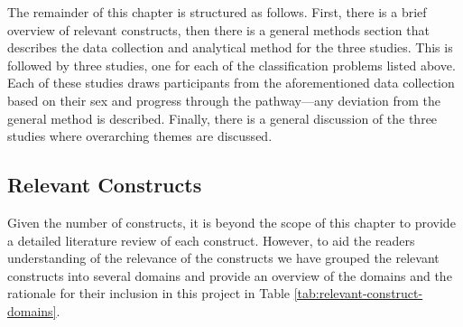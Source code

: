 \documentclass[
  12pt,
  a4paper,
]{book}
\begin{document}
The remainder of this chapter is structured as follows. First, there is a brief overview of relevant constructs, then there is a general methods section that describes the data collection and analytical method for the three studies. This is followed by three studies, one for each of the classification problems listed above. Each of these studies draws participants from the aforementioned data collection based on their sex and progress through the pathway---any deviation from the general method is described. Finally, there is a general discussion of the three studies where overarching themes are discussed.

\hypertarget{pra-relevant-constructs}{%
\subsection{Relevant Constructs}\label{pra-relevant-constructs}}

Given the number of constructs, it is beyond the scope of this chapter to provide a detailed literature review of each construct. However, to aid the readers understanding of the relevance of the constructs we have grouped the relevant constructs into several domains and provide an overview of the domains and the rationale for their inclusion in this project in Table \ref{tab:relevant-construct-domains}.
\end{document}
